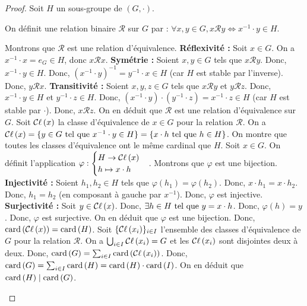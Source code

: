 \documentclass[12pt, a4paper]{report}
\begin{document}
\begin{proof}
    Soit $H$ un sous-groupe de $(G,\cdot)$.

    On définit une relation binaire $\mathcal{R}$ sur $G$ par : $\forall x,y \in G, x\mathcal{R}y \iff x^{-1} \cdot y \in H$.

    \begin{outline}
        \1 Montrons que $\mathcal{R}$ est une relation d'équivalence.
            \2 \textbf{Réflexivité :} Soit $x \in G$. On a $x^{-1} \cdot x = e_G \in H$, donc $x \mathcal{R} x$.
            \2 \textbf{Symétrie :} Soient $x,y \in G$ tels que $x \mathcal{R} y$. Donc, $x^{-1} \cdot y \in H$. Donc, $(x^{-1} \cdot y)^{-1} = y^{-1} \cdot x \in H$ (car $H$ est stable par l'inverse). Donc, $y \mathcal{R} x$.
            \2 \textbf{Transitivité :} Soient $x,y,z \in G$ tels que $x \mathcal{R} y$ et $y \mathcal{R} z$. Donc, $x^{-1} \cdot y \in H$ et $y^{-1} \cdot z \in H$. Donc, $(x^{-1} \cdot y) \cdot (y^{-1} \cdot z) = x^{-1} \cdot z \in H$ (car $H$ est stable par $\cdot$). Donc, $x \mathcal{R} z$.
        \1 On en déduit que $\mathcal{R}$ est une relation d'équivalence sur $G$.
        \1 Soit $\mathcal{C}\ell\left(x\right)$ la classe d'équivalence de $x\in G$ pour la relation $\mathcal{R}$.
            \2 On a $\mathcal{C}\ell\left(x\right) = \{y\in G\text{ tel que } x^{-1}\cdot y\in H\} = \{x\cdot h\text{ tel que } h\in H\}$.
        \1 On montre que toutes les classes d'équivalence ont le même cardinal que $H$.
            \2 Soit $x\in G$. On définit l'application $\varphi : \begin{cases}H \to \mathcal{C}\ell\left(x\right)\\ h\mapsto x\cdot h\end{cases}$.
            \2 Montrons que $\varphi$ est une bijection.
                \3 \textbf{Injectivité :} Soient $h_1,h_2 \in H$ tels que $\varphi(h_1) = \varphi(h_2)$. Donc, $x\cdot h_1 = x\cdot h_2$. Donc, $h_1 = h_2$ (en composant à gauche par $x^{-1}$). Donc, $\varphi$ est injective.
                \3 \textbf{Surjectivité :} Soit $y \in \mathcal{C}\ell\left(x\right)$. Donc, $\exists h \in H \text{ tel que } y = x\cdot h$. Donc, $\varphi(h) = y$. Donc, $\varphi$ est surjective.
            \2 On en déduit que $\varphi$ est une bijection.
            \2 Donc, $\mathrm{card}\left(\mathcal{C}\ell\left(x\right)\right) = \mathrm{card}\left(H\right)$.
        \1 Soit $\{\mathcal{C}\ell\left(x_i\right)\}_{i\in I}$ l'ensemble des classes d'équivalence de $G$ pour la relation $\mathcal{R}$.
            \2 On a $\bigcup_{i\in I} \mathcal{C}\ell\left(x_i\right) = G$ et les $\mathcal{C}\ell\left(x_i\right)$ sont disjointes deux à deux.
            \2 Donc, $\mathrm{card}\left(G\right) = \sum_{i\in I} \mathrm{card}\left(\mathcal{C}\ell\left(x_i\right)\right)$.
            \2 Donc, $\mathrm{card}\left(G\right) = \sum_{i\in I} \mathrm{card}\left(H\right) = \mathrm{card}\left(H\right) \cdot \mathrm{card}\left(I\right)$.
        \1 On en déduit que $\mathrm{card}\left(H\right) \mid \mathrm{card}\left(G\right)$.
    \end{outline}
\end{proof}
\end{document}
